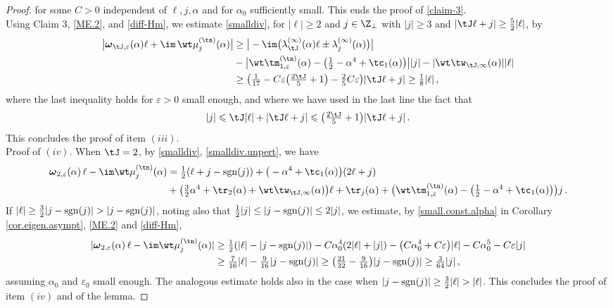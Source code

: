 \documentclass[a4paper,reqno,10pt]{article}
\newcommand{\bomega}{{\boldsymbol{\omega}}}
\begin{document}
\begin{proof}
   		for some  $C>0$ independent of $\ell,j,\alpha$ and for $\alpha_{0}$ sufficiently small. This ends the proof of \eqref{claim-3}.
        \\[1mm]
   	Using Claim 3, \eqref{ME.2}, and \eqref{diff-Hm}, we estimate \eqref{smalldiv}, for $|\ell|\geq 2$ and $j\in\Z_{\perp}$ with $|j|\geq 3$ and $|\tJ \ell + j|\geq \tfrac52 |\ell|$, by
   	\begin{align}
   		\big| \bomega_{\tJ,\varepsilon}(\alpha)  \ell + \im\,\wt\mu_{j}^{(\tn)}(\alpha) \big| &  \geq \big| -\im \big( \lambda_{\tJ}^{(\infty)}(\alpha)  \ell \pm \lambda_{j}^{(\infty)}(\alpha) \big) \big| \\
        &-  \big| \wt\tm_{1,\varepsilon}^{(\tn)}(\alpha) - \big( \tfrac12 -\alpha^4 + \tc_{1}(\alpha) \big)  \big| |j| - |\wt\tw_{\tJ,\infty}(\alpha)| |\ell|  \\
   		& \geq \big( \tfrac{1}{17} - C\varepsilon\big(\tfrac{2\tJ}{5}+1\big)  - \tfrac25 C\varepsilon  \big)|\tJ\ell+j| \geq \tfrac{1}{8}|\ell|  \,,
   	\end{align}
   	where the last inequality holds for $\varepsilon>0$ small enough, and where we have used in the last line the fact that
    $$
    |j|\leqslant \tJ|\ell|+|\tJ\ell+j|\leqslant \big(\tfrac{2\tJ}{5}+1\big)|\tJ\ell+j|\,.
    $$
    This concludes the proof of item $(iii)$.
    	\\[1mm]
   	{\sc Proof of $(iv)$}. When $\tJ=2$, by \eqref{smalldiv}, \eqref{smalldiv.unpert}, we have
    \begin{align}
        \bomega_{2,\varepsilon}(\alpha)\,\ell - \im \wt\mu_{j}^{(\tn)}(\alpha) & = \tfrac12 (\ell + j- {\rm sgn}(j)) + \big( -\alpha^4 + \tc_1(\alpha) \big) (2\ell + j) \\
        & + \big( \tfrac32 \alpha^4 + \tr_{2}(\alpha) +\wt\tw_{\tJ,\infty}(\alpha) \big)\ell   + \tr_{j}(\alpha) + \big( \wt\tm_{1,\varepsilon}^{(\tn)}(\alpha) - \big( \tfrac12 -\alpha^4 + \tc_{1}(\alpha) \big)  \big)j \,. 
    \end{align}
    If $|\ell|\geq \frac32 |j-{\rm sgn}(j)|> |j-{\rm sgn}(j)|$, noting also that $\tfrac12 |j| \leq |j-{\rm sgn}(j)|\leq 2|j|$,
    we estimate, by \eqref{small.const.alpha} in Corollary \ref{cor.eigen.asympt}, \eqref{ME.2} and \eqref{diff-Hm},
    \begin{align}
        |   \bomega_{2,\varepsilon}(\alpha)\,\ell - \im \wt\mu_{j}^{(\tn)}(\alpha) | & \geq \tfrac12 ( |\ell| - |j-{\rm sgn}(j)| ) - C \alpha_{0}^4 ( 2|\ell| +|j| ) - \big( C\alpha_0^4 + C\varepsilon \big)|\ell| - C \alpha_0^5 - C\varepsilon |j| \\
        & \geq \tfrac{7}{16} |\ell| - \tfrac{9}{16} |j-{\rm sgn}(j)| \geq \big( \tfrac{21}{32} - \tfrac{9}{16} \big) |j-{\rm sgn}(j)| \geq  \tfrac{3}{64} |j|\,,
    \end{align}
    assuming $\alpha_0$ and $\varepsilon_0$ small enough. The analogous estimate holds also in the case when $|j-{\rm sgn}(j)|\geq  \tfrac32 |\ell|>|\ell|$. This concludes the proof of item $(iv)$ and of the lemma.
\end{proof}
\end{document}
